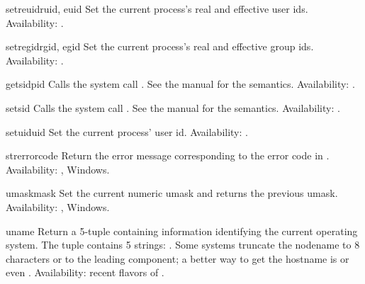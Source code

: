 \begin{funcdesc}{setreuid}{ruid, euid}
Set the current process's real and effective user ids.
Availability: \UNIX.
\end{funcdesc}

\begin{funcdesc}{setregid}{rgid, egid}
Set the current process's real and effective group ids.
Availability: \UNIX.
\end{funcdesc}

\begin{funcdesc}{getsid}{pid}
Calls the system call .  See the \UNIX{} manual
for the semantics.
Availability: \UNIX. 
\end{funcdesc}

\begin{funcdesc}{setsid}{}
Calls the system call .  See the \UNIX{} manual
for the semantics.
Availability: \UNIX.
\end{funcdesc}

\begin{funcdesc}{setuid}{uid}
Set the current process' user id.
Availability: \UNIX.
\end{funcdesc}

\begin{funcdesc}{strerror}{code}
Return the error message corresponding to the error code in
.
Availability: \UNIX, Windows.
\end{funcdesc}

\begin{funcdesc}{umask}{mask}
Set the current numeric umask and returns the previous umask.
Availability: \UNIX, Windows.
\end{funcdesc}

\begin{funcdesc}{uname}{}
Return a 5-tuple containing information identifying the current
operating system.  The tuple contains 5 strings:
.  Some systems truncate the nodename to 8
characters or to the leading component; a better way to get the
hostname is 
or even
.
Availability: recent flavors of \UNIX.
\end{funcdesc}

